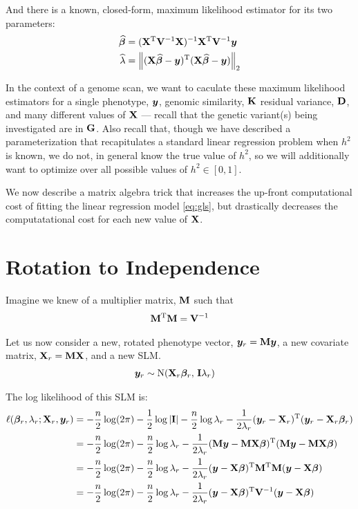 And there is a known, closed-form, maximum likelihood estimator for its two parameters:
\begin{align}
	\widehat{\boldsymbol{\beta}}    &= (\mathbf{X} ^\mathrm{T} \mathbf{V} ^{-1} \mathbf{X}) ^{-1} \mathbf{X} ^\mathrm{T} \mathbf{V} ^{-1} \bm{y}\\
    \widehat{\lambda}   &= \left\lVert(\mathbf{X}\widehat{\boldsymbol{\beta}} - \bm{y})^\mathrm{T}(\mathbf{X}\widehat{\boldsymbol{\beta}} - \bm{y})\right\rVert_{2}
\end{align}

In the context of a genome scan, we want to caculate these maximum likelihood estimators for a single phenotype, $\bm{y}$, genomic similarity, $\mathbf{K}$ residual variance, $\mathbf{D}$, and many different values of $\mathbf{X}$ --- recall that the genetic variant(s) being investigated are in $\mathbf{G}$.
Also recall that, though we have described a parameterization that recapitulates a standard linear regression problem when $h^2$ is known, we do not, in general know the true value of $h^2$, so we will additionally want to optimize over all possible values of $h^2 \in [0, 1]$.

We now describe a matrix algebra trick that increases the up-front computational cost of fitting the linear regression model \cref{eq:gls}, but drastically decreases the computatational cost for each new value of $\mathbf{X}$.


\section{Rotation to Independence}

Imagine we knew of a multiplier matrix, $\mathbf{M}$ such that
\begin{align}
	\mathbf{M} ^\mathrm{T} \mathbf{M} = \mathbf{V} ^{-1}
\end{align}
 
Let us now consider a new, rotated phenotype vector, $\bm{y}_r = \mathbf{M} \bm{y}$, a new covariate matrix, $\mathbf{X}_r = \mathbf{M} \mathbf{X}$, and a new SLM.
\begin{align}
    \bm{y}_r &\sim \mathrm{N}(\mathbf{X}_r \boldsymbol{\beta}_r, \, \mathbf{I} \lambda_r)
\end{align}

The log likelihood of this SLM is:
\begin{align}
    \ell(\boldsymbol{\beta}_r, \lambda_r; \mathbf{X}_r, \bm{y}_r) 
    &=    -\frac{n}{2}\log(2\pi)
          -\frac{1}{2}\log|\mathbf{I}|
          -\frac{n}{2}\log\lambda_r
          -\frac{1}{2\lambda_r}
          (\bm{y}_r - \mathbf{X}_r)^\mathrm{T} (\bm{y}_r - \mathbf{X}_r\boldsymbol{\beta}_r)\\
    & =
          -\frac{n}{2}\log(2\pi)
          -\frac{n}{2}\log\lambda_r
          -\frac{1}{2\lambda_r}
          (\mathbf{M}\bm{y} - \mathbf{M}\mathbf{X}\boldsymbol{\beta})^\mathrm{T} (\mathbf{M}\bm{y} - \mathbf{M}\mathbf{X}\boldsymbol{\beta})\\
    &=    -\frac{n}{2}\log(2\pi)
          -\frac{n}{2}\log\lambda_r
          -\frac{1}{2\lambda_r}
          (\bm{y} - \mathbf{X}\boldsymbol{\beta})^\mathrm{T} \mathbf{M}^\mathrm{T} \mathbf{M} (\bm{y} - \mathbf{X}\boldsymbol{\beta})\\
    &=    -\frac{n}{2}\log(2\pi)
          -\frac{n}{2}\log\lambda_r
          -\frac{1}{2\lambda_r}
          (\bm{y}-\mathbf{X}\boldsymbol{\beta})^\mathrm{T} \mathbf{V}^{-1} (\bm{y}-\mathbf{X}\boldsymbol{\beta})
\end{align}

